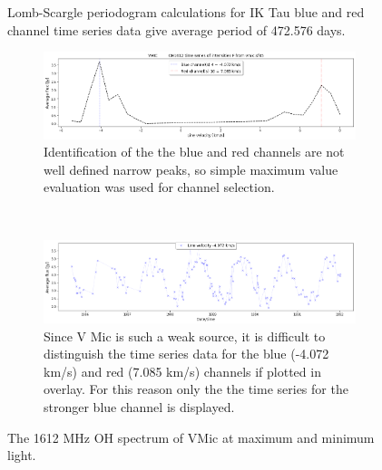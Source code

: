 \begin{figure}
\begin{subfigure}{0.33\hsize}
  \end{subfigure}%
\caption{\label{fig:iktauperiod}Lomb-Scargle periodogram calculations for IK Tau blue and red channel time series data give average period of 472.576 days.}
\end{figure}


\begin{figure}
\centering
  \begin{subfigure}{\hsize}
    \includegraphics[width=0.95\hsize]{images/VMic_avg_spectrum.png}
    \caption{\label{fig:vmicspectrum}Identification of the the blue and red channels are not well defined narrow peaks, so simple maximum value evaluation was used for channel selection.}
  \end{subfigure}%
  \\
  \begin{subfigure}{\hsize}
    \includegraphics[width=0.95\hsize]{images/VMic_ts_blue4.png}
    \caption{\label{fig:vmictimeseries}Since V Mic is such a weak source, it is difficult to distinguish the time series data for the blue (-4.072 km/s) and red (7.085 km/s) channels if plotted in overlay. For this reason only the the time series for the stronger blue channel is displayed.}
  \end{subfigure}%
\caption{\label{fig:vmic}The 1612 MHz OH spectrum of VMic at maximum and minimum light.}
\end{figure}


